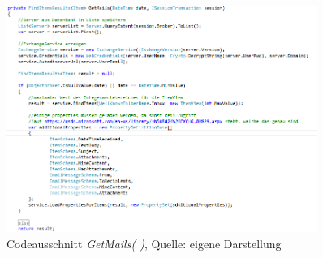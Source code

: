 \begin{figure}[h!]
\includegraphics[width=0.9\textwidth]{Abbildungen/Codeausschnitt.png}
	\caption*{Codeausschnitt \textit{GetMails( )}, Quelle: eigene Darstellung}
	\label{Codeausschnitt}
\end{figure}







